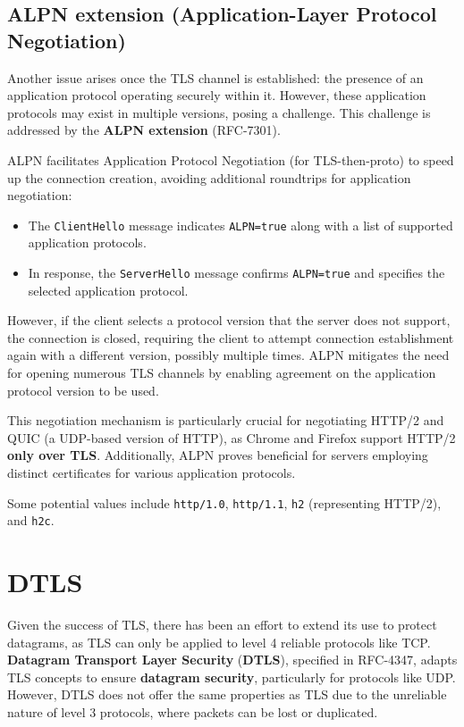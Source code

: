\subsection*{ALPN extension (Application-Layer Protocol Negotiation)}
Another issue arises once the TLS channel is established: the presence of an application protocol operating securely within it. However, these application protocols may exist in multiple versions, posing a challenge. This challenge is addressed by the \textbf{ALPN extension} (RFC-7301).

ALPN facilitates Application Protocol Negotiation (for TLS-then-proto) to speed up the connection creation, avoiding additional roundtrips for application negotiation:
\begin{itemize}
    \item The \texttt{ClientHello} message indicates \texttt{ALPN=true} along with a list of supported application protocols.
    \item In response, the \texttt{ServerHello} message confirms \texttt{ALPN=true} and specifies the selected application protocol.
\end{itemize}

However, if the client selects a protocol version that the server does not support, the connection is closed, requiring the client to attempt connection establishment again with a different version, possibly multiple times. ALPN mitigates the need for opening numerous TLS channels by enabling agreement on the application protocol version to be used.

This negotiation mechanism is particularly crucial for negotiating HTTP/2 and QUIC (a UDP-based version of HTTP), as Chrome and Firefox support HTTP/2 \textbf{only over TLS}. Additionally, ALPN proves beneficial for servers employing distinct certificates for various application protocols.

Some potential values include \texttt{http/1.0}, \texttt{http/1.1}, \texttt{h2} (representing HTTP/2), and \texttt{h2c}.


\section{DTLS}

Given the success of TLS, there has been an effort to extend its use to protect datagrams, as TLS can only be applied to level 4 reliable protocols like TCP. \textbf{Datagram Transport Layer Security} (\textbf{DTLS}), specified in RFC-4347, adapts TLS concepts to ensure \textbf{datagram security}, particularly for protocols like UDP. However, DTLS does not offer the same properties as TLS due to the unreliable nature of level 3 protocols, where packets can be lost or duplicated.

